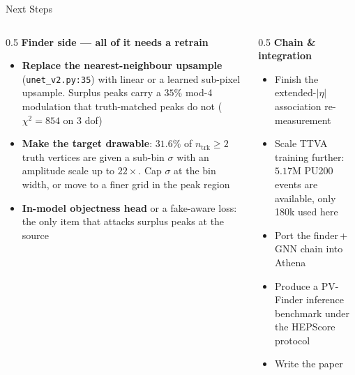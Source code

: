 \documentclass[xcolor=table,aspectratio=169]{beamer}
\newcommand{\ntrk}{\ensuremath{n_\mathrm{trk}}}
\begin{document}
\begin{frame}{Next Steps}
    \begin{columns}[t]
        \begin{column}{0.5\linewidth}
            \textbf{Finder side --- all of it needs a retrain}
            \begin{itemize}
                \setlength\itemsep{0.4em}
                \item \textbf{Replace the nearest-neighbour upsample}
                    (\texttt{unet\_v2.py:35}) with linear or a learned sub-pixel
                    upsample. Surplus peaks carry a $35\%$ mod-4 modulation that
                    truth-matched peaks do not ($\chi^2 = 854$ on 3 dof)
                \item \textbf{Make the target drawable}: $31.6\%$ of $\ntrk\geq2$
                    truth vertices are given a sub-bin $\sigma$ with an amplitude
                    scale up to $22\times$. Cap $\sigma$ at the bin width, or move to
                    a finer grid in the peak region
                \item \textbf{In-model objectness head} or a fake-aware loss: the only
                    item that attacks surplus peaks at the source
            \end{itemize}
        \end{column}
        \begin{column}{0.5\linewidth}
            \textbf{Chain \& integration}
            \begin{itemize}
                \setlength\itemsep{0.5em}
                \item Finish the extended-$|\eta|$ association re-measurement
                \item Scale TTVA training further: $5.17$M PU200 events are available, only 180k used here
                \item Port the finder\,+\,GNN chain into Athena
                \item Produce a PV-Finder inference benchmark under the HEPScore protocol
                \item Write the paper
            \end{itemize}
        \end{column}
    \end{columns}
\end{frame}
\end{document}
